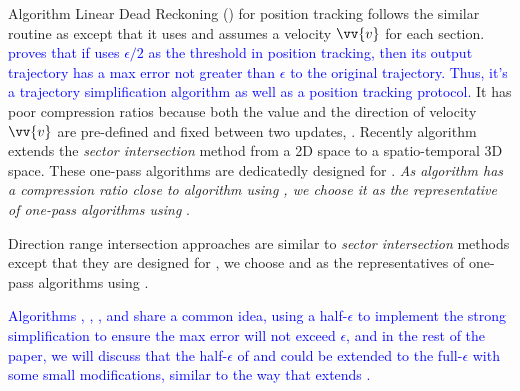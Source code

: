 Algorithm Linear Dead Reckoning (\ldr) for position tracking \cite{Trajcevski:DDR} follows the similar routine as \rwa except that it uses and assumes a velocity ${\vv{v}}$ for each section. \textcolor{blue}{\cite{Trajcevski:DDR} proves that if \ldr uses $\epsilon/2$ as the threshold in position tracking, then its output trajectory has a max error not greater than $\epsilon$ to the original trajectory. Thus, it's a trajectory simplification algorithm as well as a position tracking protocol.}
It has poor compression ratios because both the value and the direction of velocity ${\vv{v}}$ are pre-defined and fixed between two updates, .
Recently algorithm \cised~\cite{Lin:Cised} extends the \textit{sector intersection} method \siped from a 2D space to a spatio-temporal 3D space.
These one-pass algorithms are dedicatedly designed for \sed. {\em As algorithm \cised has a compression ratio close to algorithm \dpa using \sed, we choose it as the representative of one-pass algorithms using \sed}.


{Direction range intersection} approaches are similar to  \emph{sector intersection} methods except that they are designed for \dad, we choose \intersec \cite{Long:Direction} and \interval \cite{Ke:Interval} as the representatives of one-pass algorithms using \dad.

\textcolor{blue}{Algorithms \siped, \ldr, \operb, \cised and \intersec share a common idea, \ie using a half-$\epsilon$ to implement the strong simplification to ensure the max error will not exceed $\epsilon$, and in the rest of the paper, we will discuss that the half-$\epsilon$ of \siped and \cised could be extended to the full-$\epsilon$ with some small modifications, similar to the way that \interval extends \intersec. }

